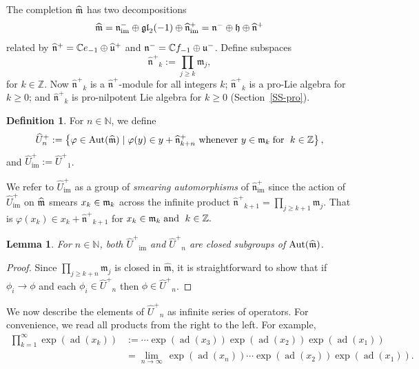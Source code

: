 \documentclass[11pt,letterpaper]{amsart}
\newcounter{thecounter}
\numberwithin{thecounter}{section}
\newtheorem{lemma}[thecounter]{Lemma}
\theoremstyle{definition}
\newtheorem{defn}[thecounter]{Definition}
\DeclareMathOperator{\Aut}{Aut}
\DeclareMathOperator{\ad}{ad}
\DeclareMathOperator{\im}{{im}}
\newcommand{\Z}{{\mathbb Z}}
\newcommand{\C}{{\mathbb C}}
\newcommand{\N}{{\mathbb N}}
\newcommand{\Uhp}{{\widehat{U}^+}}
\newcommand{\Uhimp}{{\widehat{U}_{\im}^+}}
\newcommand{\nhp}{{\widehat{\mathfrak{n}}^+}}
\newcommand{\nhimp}{{\widehat{\mathfrak{n}}_{\im}^+}}
\newcommand{\nimm}{{\mathfrak{n}_{\im}^-}}
\begin{document}
The completion $\widehat{\frak m}$ has two decompositions
$$\widehat{\frak m} = \nimm \oplus \frak{gl}_2({-1}) \oplus \nhimp 
  =  \frak n^- \oplus \frak h \oplus \widehat{\frak n}^+$$
related by 
$\widehat{\frak n}^+  = \C e_{-1}\oplus\widehat{\frak u}^+$ and
${\frak n}^- = \C f_{-1}\oplus {\frak u}^-$.
Define subspaces
$$ \nhp_k := \prod_{j\ge k} \mathfrak{m}_j, $$
for $k\in \Z$.
Now $\nhp_k$ is a $\widehat{\mathfrak{n}}^+$-module for all integers $k$;
$\nhp_k$ is a pro-Lie algebra for $k\ge0$; and
$\nhp_k$ is  pro-nilpotent Lie algebra for $k\ge0$ (Section~\ref{SS-pro}). 

\begin{defn}  For $n\in\N$, we define
$$
  \Uhp_n := \left\{ \varphi\in\Aut(\widehat{\frak m}) \mid 
  \varphi(y)\in y + \nhp_{k+n}\text{ whenever }y\in{\frak m}_k\;\text{for }\; k\in\mathbb{Z}\right\},
$$
and $\Uhimp:= \Uhp_1$.
\end{defn}
We refer to $\Uhimp$ as a group of \emph{smearing automorphisms} of $\nhimp$ since the action of $ \Uhimp$ on $\widehat{\frak m}$ smears $x_k\in{\frak m}_k$ across the infinite product  $\nhp_{k+1}=\prod_{j\ge k+1} \mathfrak{m}_{j}$. That is
$\varphi(x_k)\in x_k + \nhp_{k+1}$
for $x_k\in{\frak m}_k\;\text{and }\; k\in\mathbb{Z}.$

\begin{lemma}\label{L-Uhat}
For $n\in\N$, both $\Uhp_{\im}$ and $\Uhp_n$ are closed %
subgroups of $\Aut(\widehat{\frak m})$.
\end{lemma}

\begin{longver}
\begin{proof} 
Since $\prod_{j\ge k+n} {\mathfrak{m}}_{j}$ is closed in $\widehat{\mathfrak{m}}$, it is straightforward to show that if $\phi_i\to \phi$ and each 
$\phi_i\in\Uhp_n$ then $\phi\in\Uhp_n$.
\end{proof}
\end{longver}

We now describe the elements of $\Uhp_n$ as  infinite series of operators.  
For convenience, we read all products from the right to the left. For example,
\begin{align*}
\prod_{k=1}^\infty \exp\left(\ad\left(x_k \right) \right)
&:= \cdots  \exp\left(\ad\left(x_3 \right) \right)  \exp\left(\ad\left(x_2 \right) \right) \exp\left(\ad\left(x_1 \right) \right)\\
&= \lim_{n\to\infty}\,  \exp\left(\ad\left(x_n \right) \right) \cdots  \exp\left(\ad\left(x_2 \right) \right) \exp\left(\ad\left(x_1 \right) \right).
\end{align*}
\end{document}
